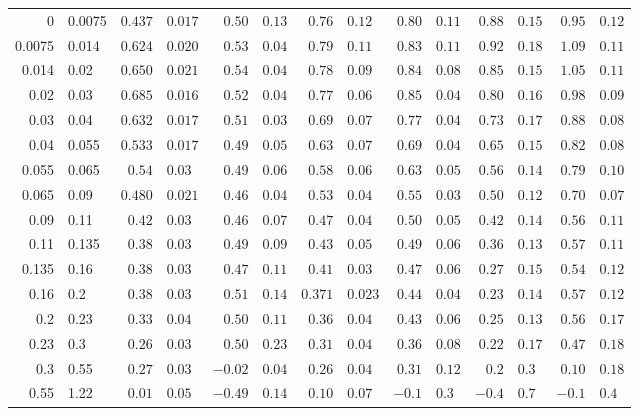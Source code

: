 \documentclass{aa}
\begin{document}
\begin{table}
\begin{centering}
{\begin{tabular}{r@{ -- }l r@{$\pm$}l r@{$\pm$}l r@{$\pm$}l r@{$\pm$}l r@{$\pm$}l r@{$\pm$}l}
\hline                        %
0 & 0.0075         & $0.437$ & $0.017$ & $0.50$ & $0.13$ & $0.76$ & $0.12$ & $0.80$ & $0.11$ & $0.88$ & $0.15$ & $0.95$ & $0.12$ \\
0.0075 & 0.014 & $0.624$ & $0.020$ & $0.53$ & $0.04$ & $0.79$ & $0.11$ & $0.83$ & $0.11$ & $0.92$ & $0.18$ & $1.09$ & $0.11$ \\
0.014 & 0.02      & $0.650$ & $0.021$ & $0.54$ & $0.04$ & $0.78$ & $0.09$ & $0.84$ & $0.08$ & $0.85$ & $0.15$ & $1.05$ & $0.11$ \\
0.02 & 0.03        & $0.685$ & $0.016$ & $0.52$ & $0.04$ & $0.77$ & $0.06$ & $0.85$ & $0.04$ & $0.80$ & $0.16$ & $0.98$ & $0.09$ \\
0.03 & 0.04        & $0.632$ & $0.017$ & $0.51$ & $0.03$ & $0.69$ & $0.07$ & $0.77$ & $0.04$ & $0.73$ & $0.17$ & $0.88$ & $0.08$ \\
0.04 & 0.055     & $0.533$ & $0.017$ & $0.49$ & $0.05$ & $0.63$ & $0.07$ & $0.69$ & $0.04$ & $0.65$ & $0.15$ & $0.82$ & $0.08$ \\
0.055 & 0.065   & $0.54$ & $0.03$ & $0.49$ & $0.06$ & $0.58$ & $0.06$ & $0.63$ & $0.05$ & $0.56$ & $0.14$ & $0.79$ & $0.10$ \\
0.065 & 0.09     & $0.480$ & $0.021$ & $0.46$ & $0.04$ & $0.53$ & $0.04$ & $0.55$ & $0.03$ & $0.50$ & $0.12$ & $0.70$ & $0.07$ \\
0.09 & 0.11       & $0.42$ & $0.03$ & $0.46$ & $0.07$ & $0.47$ & $0.04$ & $0.50$ & $0.05$ & $0.42$ & $0.14$ & $0.56$ & $0.11$ \\
0.11 & 0.135     & $0.38$ & $0.03$ & $0.49$ & $0.09$ & $0.43$ & $0.05$ & $0.49$ & $0.06$ & $0.36$ & $0.13$ & $0.57$ & $0.11$ \\
0.135 & 0.16     & $0.38$ & $0.03$ & $0.47$ & $0.11$ & $0.41$ & $0.03$ & $0.47$ & $0.06$ & $0.27$ & $0.15$ & $0.54$ & $0.12$ \\
0.16 & 0.2         & $0.38$ & $0.03$ & $0.51$ & $0.14$ & $0.371$ & $0.023$ & $0.44$ & $0.04$ & $0.23$ & $0.14$ & $0.57$ & $0.12$ \\
0.2 & 0.23         & $0.33$ & $0.04$ & $0.50$ & $0.11$ & $0.36$ & $0.04$ & $0.43$ & $0.06$ & $0.25$ & $0.13$ & $0.56$ & $0.17$ \\
0.23 & 0.3         & $0.26$ & $0.03$ & $0.50$ & $0.23$ & $0.31$ & $0.04$ & $0.36$ & $0.08$ & $0.22$ & $0.17$ & $0.47$ & $0.18$ \\
0.3 & 0.55         & $0.27$ & $0.03$ & $-0.02$ & $0.04$ & $0.26$ & $0.04$ & $0.31$ & $0.12$ & $0.2$ & $0.3$ & $0.10$ & $0.18$ \\
0.55 & 1.22        & $0.01$ & $0.05$ & $-0.49$ & $0.14$ & $0.10$ & $0.07$ & $-0.1$ & $0.3$ & $-0.4$ & $0.7$ & $-0.1$ & $0.4$ \\



\end{tabular}}
\end{centering}
\end{table}
\end{document}

